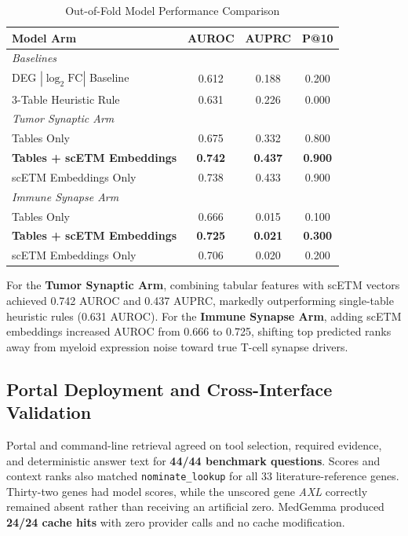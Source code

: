 \documentclass[conference]{IEEEtran}
\begin{document}
\begin{table}[t]
\centering
\caption{Out-of-Fold Model Performance Comparison}
\label{tab:model_performance}
\small
\begin{tabular}{lccc}
\hline
\textbf{Model Arm} & \textbf{AUROC} & \textbf{AUPRC} & \textbf{P@10} \\ \hline
\textit{Baselines} & & & \\
DEG $|\log_2\text{FC}|$ Baseline & 0.612 & 0.188 & 0.200 \\
3-Table Heuristic Rule & 0.631 & 0.226 & 0.000 \\ \hline
\textit{Tumor Synaptic Arm} & & & \\
Tables Only & 0.675 & 0.332 & 0.800 \\
\textbf{Tables + scETM Embeddings} & \textbf{0.742} & \textbf{0.437} & \textbf{0.900} \\
scETM Embeddings Only & 0.738 & 0.433 & 0.900 \\ \hline
\textit{Immune Synapse Arm} & & & \\
Tables Only & 0.666 & 0.015 & 0.100 \\
\textbf{Tables + scETM Embeddings} & \textbf{0.725} & \textbf{0.021} & \textbf{0.300} \\
scETM Embeddings Only & 0.706 & 0.020 & 0.200 \\ \hline
\end{tabular}
\end{table}

For the \textbf{Tumor Synaptic Arm}, combining tabular features with scETM vectors achieved 0.742 AUROC and 0.437 AUPRC, markedly outperforming single-table heuristic rules (0.631 AUROC). For the \textbf{Immune Synapse Arm}, adding scETM embeddings increased AUROC from 0.666 to 0.725, shifting top predicted ranks away from myeloid expression noise toward true T-cell synapse drivers.

\subsection{Portal Deployment and Cross-Interface Validation}
Portal and command-line retrieval agreed on tool selection, required evidence, and deterministic answer text for \textbf{44/44 benchmark questions}. Scores and context ranks also matched \texttt{nominate\_lookup} for all 33 literature-reference genes. Thirty-two genes had model scores, while the unscored gene \emph{AXL} correctly remained absent rather than receiving an artificial zero. MedGemma produced \textbf{24/24 cache hits} with zero provider calls and no cache modification.
\end{document}
